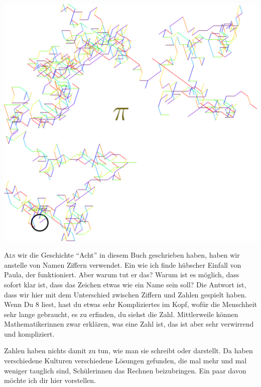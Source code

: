 ﻿
\thispagestyle{empty}
\begin{center}
\includegraphics[width=\textwidth]{./bilder/pi.png}
\end{center}
\vspace*{\fill}
{\centering\fontsize{50}{48} \color{farbe}\par}
\newpage
\lettrine[lines=3, lhang=.2, loversize=.25, lraise=0.05, findent=0.1em,nindent=0em]{A}{ls} wir die Geschichte \enquote{Acht} in diesem Buch geschrieben haben, haben wir anstelle von Namen Ziffern verwendet. Ein wie ich finde hübscher Einfall von Paula, der funktioniert. Aber warum tut er das? Warum ist es möglich, dass sofort klar ist, dass das Zeichen  etwas wie ein Name sein soll? Die Antwort ist, dass wir hier mit dem Unterschied zwischen Ziffern und Zahlen gespielt haben. Wenn Du 8 liest, hast du etwas sehr Kompliziertes im Kopf, wofür die Menschheit sehr lange gebraucht, es zu erfinden, du siehst die Zahl. Mittlerweile können Mathematikerinnen zwar erklären, was eine Zahl ist, das ist aber sehr verwirrend und kompliziert.

Zahlen haben nichts damit zu tun, wie man sie schreibt oder darstellt. Da haben verschiedene Kulturen verschiedene Lösungen gefunden, die mal mehr und mal weniger tauglich sind, Schülerinnen das Rechnen beizubringen. Ein paar davon möchte ich dir hier vorstellen.

